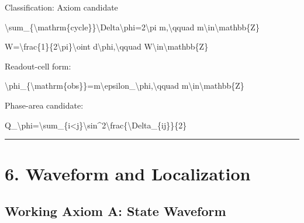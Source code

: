\documentclass[
  a4paper,
]{article}
\newenvironment{Shaded}{}{}
\newcommand{\NormalTok}[1]{#1}
\begin{document}
Classification: Axiom candidate

\begin{Shaded}
\begin{Highlighting}[]
\NormalTok{\textbackslash{}sum\_\{\textbackslash{}mathrm\{cycle\}\}\textbackslash{}Delta\textbackslash{}phi=2\textbackslash{}pi m,\textbackslash{}qquad m\textbackslash{}in\textbackslash{}mathbb\{Z\}}
\end{Highlighting}
\end{Shaded}

\begin{Shaded}
\begin{Highlighting}[]
\NormalTok{W=\textbackslash{}frac\{1\}\{2\textbackslash{}pi\}\textbackslash{}oint d\textbackslash{}phi,\textbackslash{}qquad W\textbackslash{}in\textbackslash{}mathbb\{Z\}}
\end{Highlighting}
\end{Shaded}

Readout-cell form:

\begin{Shaded}
\begin{Highlighting}[]
\NormalTok{\textbackslash{}phi\_\{\textbackslash{}mathrm\{obs\}\}=m\textbackslash{}epsilon\_\textbackslash{}phi,\textbackslash{}qquad m\textbackslash{}in\textbackslash{}mathbb\{Z\}}
\end{Highlighting}
\end{Shaded}

Phase-area candidate:

\begin{Shaded}
\begin{Highlighting}[]
\NormalTok{Q\_\textbackslash{}phi=\textbackslash{}sum\_\{i\textless{}j\}\textbackslash{}sin\^{}2\textbackslash{}frac\{\textbackslash{}Delta\_\{ij\}\}\{2\}}
\end{Highlighting}
\end{Shaded}

\begin{center}\rule{0.5\linewidth}{0.5pt}\end{center}

\section{6. Waveform and Localization}\label{waveform-and-localization}

\subsection{Working Axiom A: State
Waveform}\label{working-axiom-a-state-waveform}
\end{document}
